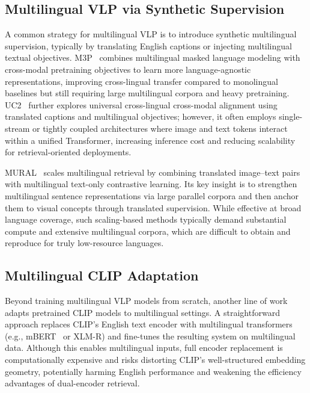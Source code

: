 \subsection{Multilingual VLP via Synthetic Supervision}
A common strategy for multilingual VLP is to introduce synthetic multilingual supervision, typically by translating English captions or injecting multilingual textual objectives. M3P~\cite{ni2021m3plearninguniversalrepresentations} combines multilingual masked language modeling with cross-modal pretraining objectives to learn more language-agnostic representations, improving cross-lingual transfer compared to monolingual baselines but still requiring large multilingual corpora and heavy pretraining. UC2~\cite{zhou2021uc2universalcrosslingualcrossmodal} further explores universal cross-lingual cross-modal alignment using translated captions and multilingual objectives; however, it often employs single-stream or tightly coupled architectures where image and text tokens interact within a unified Transformer, increasing inference cost and reducing scalability for retrieval-oriented deployments.

MURAL~\cite{jain2021muralmultimodalmultitaskretrieval} scales multilingual retrieval by combining translated image--text pairs with multilingual text-only contrastive learning. Its key insight is to strengthen multilingual sentence representations via large parallel corpora and then anchor them to visual concepts through translated supervision. While effective at broad language coverage, such scaling-based methods typically demand substantial compute and extensive multilingual corpora, which are difficult to obtain and reproduce for truly low-resource languages.

\subsection{Multilingual CLIP Adaptation}
Beyond training multilingual VLP models from scratch, another line of work adapts pretrained CLIP models to multilingual settings. A straightforward approach replaces CLIP's English text encoder with multilingual transformers (e.g., mBERT~\cite{pires2019multilingualmultilingualbert} or XLM-R) and fine-tunes the resulting system on multilingual data. Although this enables multilingual inputs, full encoder replacement is computationally expensive and risks distorting CLIP’s well-structured embedding geometry, potentially harming English performance and weakening the efficiency advantages of dual-encoder retrieval.

